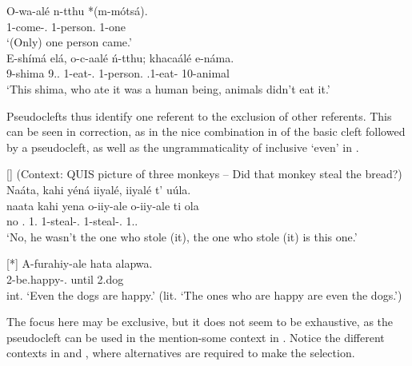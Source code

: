\documentclass[output=paper]{langscibook}
\begin{document}
\ea
\label{bkm:Ref95921657}
\gll
O-wa-alé  n-tthu  *(m-mótsá).\\
1-come-\PFV{}.\REL{}  1-person.\PRL{}  1-one\\
\glt
‘(Only) one person came.’\\

\ex
\label{bkm:Ref110409464}
\gll
E-shímá  elá,  o-c-aalé  ń{}-tthu;  khacaálé  e-náma.\\
9-shima  9.\DEM{}.\PROX{}  1-eat-\PFV{}.\REL{}  1-person.\PRL{}  \NEG{}.1\SM{}-eat-\PFV{}  10-animal\\
\glt
‘This shima, who ate it was a human being, animals didn’t eat it.’\\

\z

Pseudoclefts thus identify one referent to the exclusion of other referents. This can be seen in correction, as in the nice combination in  of the basic cleft followed by a pseudocleft, as well as the ungrammaticality of inclusive ‘even’ in .


\ea
[]{
\label{bkm:Ref95922324}
(Context: QUIS picture of three monkeys – Did that monkey steal the bread?)\\
Naáta, kahi yéná iiyalé, iiyalé t’ uúla.\\
\gll
naata  kahi  yena  o-iiy-ale  o-iiy-ale  ti  ola\\
no  \NEG{}.\COP{}  1.\PRO{}  1-steal-\PFV{}.\REL{}  1-steal-\PFV{}.\REL{}  \COP{}  1.\DEM{}.\PROX{}\\
\glt
‘No, he wasn’t the one who stole (it), the one who stole (it) is this one.’\\
}


\z

\ea
[*]{
\label{bkm:Ref95921014}
\gll
A-furahiy{}-ale  hata  alapwa.\\
2-be.happy-\PFV{}.\REL{}  until  2.dog\\
\glt
int. ‘Even the dogs are happy.’ (lit. ‘The ones who are happy are even the dogs.’)\\
}

\z

The focus here may be exclusive, but it does not seem to be exhaustive, as the pseudocleft can be used in the mention-some context in . Notice the different contexts in  and , where alternatives are required to make the selection. 
\end{document}
